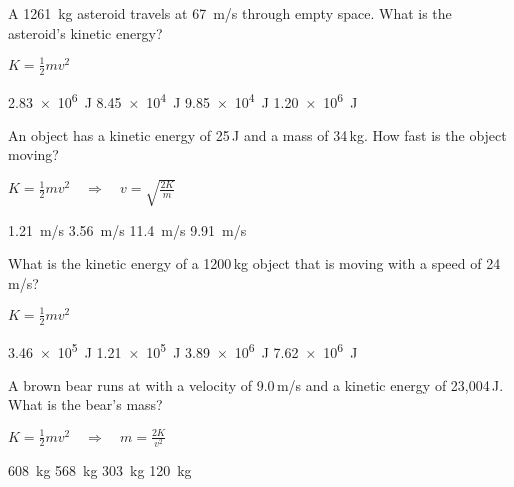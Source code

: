 \documentclass[]{exam}
\begin{document}
\begin{questions}
\question \label{X7RPxf}
A \SI{1261}{kg} asteroid travels at \SI{67}{m/s} through empty space. What is the asteroid's kinetic energy?

\ifprintanswers
{\color{red}
$K = \frac{1}{2} m v^2$
}
\fi


\begin{randomizechoices}
    \correctchoice \SI{2.83e6}{J}
    \choice \SI{8.45e4}{J}
    \choice \SI{9.85e4}{J}
    \choice \SI{1.20e6}{J}
\end{randomizechoices}


\question %
An object has a kinetic energy of 25\,J and a mass of 34\,kg. How fast is the object moving? 

\ifprintanswers
{\color{red}
$K = \frac{1}{2} m v^2 \quad \Rightarrow \quad v = \sqrt{\frac{2K}{m}}$
}
\fi

\begin{randomizechoices}
    \correctchoice \SI{1.21}{m/s}
    \choice \SI{3.56}{m/s}
    \choice \SI{11.4}{m/s}
    \choice \SI{9.91}{m/s}
\end{randomizechoices}



     
\question %
What is the kinetic energy of a 1200\,kg object that is moving with a speed of 24\,m/s? 

\ifprintanswers
{\color{red}
$K = \frac{1}{2} m v^2$
}
\fi


\begin{randomizechoices}
    \correctchoice \SI{3.46e5}{J}
    \choice \SI{1.21e5}{J}
    \choice \SI{3.89e6}{J}
    \choice \SI{7.62e6}{J}
\end{randomizechoices}


\question %
A brown bear runs at with a velocity of 9.0\,m/s and a kinetic energy of 23,004\,J. What is the bear’s mass?

\ifprintanswers
{\color{red}
$K = \frac{1}{2} m v^2 \quad \Rightarrow \quad m = \frac{2K}{v^2}$
}
\fi

\begin{randomizechoices}
    \choice \SI{608}{kg}
    \correctchoice \SI{568}{kg}
    \choice \SI{303}{kg}
    \choice \SI{120}{kg}
\end{randomizechoices}



\end{questions}
\end{document}
